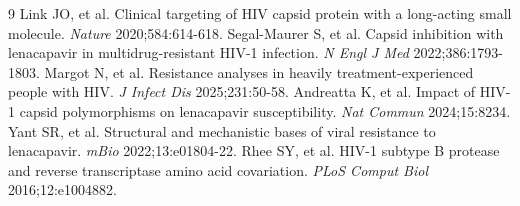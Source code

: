 \documentclass[twocolumn]{article}
\begin{document}
\begin{thebibliography}{9}
 Link JO, et al. Clinical targeting of HIV capsid protein with a long-acting small molecule. \textit{Nature} 2020;584:614-618.
 Segal-Maurer S, et al. Capsid inhibition with lenacapavir in multidrug-resistant HIV-1 infection. \textit{N Engl J Med} 2022;386:1793-1803.
 Margot N, et al. Resistance analyses in heavily treatment-experienced people with HIV. \textit{J Infect Dis} 2025;231:50-58.
 Andreatta K, et al. Impact of HIV-1 capsid polymorphisms on lenacapavir susceptibility. \textit{Nat Commun} 2024;15:8234.
 Yant SR, et al. Structural and mechanistic bases of viral resistance to lenacapavir. \textit{mBio} 2022;13:e01804-22.
 Rhee SY, et al. HIV-1 subtype B protease and reverse transcriptase amino acid covariation. \textit{PLoS Comput Biol} 2016;12:e1004882.
\end{thebibliography}
\end{document}

